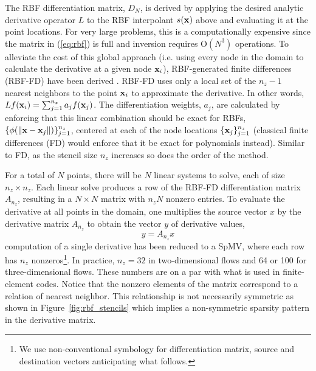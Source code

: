 \documentclass[10pt,conference,compsocconf]{IEEEtran}
\begin{document}
The RBF differentiation matrix, $D_N$, is derived by applying the
desired analytic derivative operator $L$ to the RBF interpolant
$s({\bf x})$ above and evaluating it at the point locations. For very
large problems, this is a computationally expensive since the matrix
in (\ref{eq:rbf}) is full and inversion requires O$(N^3)$
operations. To alleviate the cost of this global approach (i.e. using
every node in the domain to calculate the derivative at a given node
${\bf x}_i$), RBF-generated finite differences (RBF-FD) have been
derived \cite{TAI1,TAI2,SDY02,WrFo06,FoL11,FLBWSC12}. RBF-FD uses only
a local set of the $n_z-1$ nearest neighbors to the point ${\bf x}_i$ to
approximate the derivative. In other words,
$Lf({\bf x}_i)=\sum_{j=1}^{n_z}a_jf({\bf x}_j)$. The differentiation
weights, $a_j$, are calculated by enforcing that this linear
combination should be exact for RBFs,
$\{\phi(\|{\bf x}-{\bf x}_{j}\|)\}_{j=1}^{n_z}$, centered at each of the
node locations $\{{\bf x}_j\}_{j=1}^{n_z}$ (classical finite differences
(FD) would enforce that it be exact for polynomials instead). Similar
to FD, as the stencil size $n_z$ increases so does the order of the
method.

For a total of $N$ points, there will be $N$ linear systems to solve,
each of size $n_z \times n_z$. Each linear solve produces a row of the
RBF-FD differentiation matrix $A_{n_z}$, resulting in a $N \times N$
matrix with $n_zN$ nonzero entries. To evaluate the derivative at all
points in the domain, one multiplies the source vector $x$ by the 
derivative matrix $A_{n_z}$ to obtain the vector $y$ of derivative values, 
$$
  y = A_{n_z} x
$$
computation of a single derivative has been reduced to a SpMV, 
where each row has $n_z$ nonzeros\footnote{We use non-conventional 
symbology for differentiation matrix, source and destination vectors
anticipating what follows.}. 
In practice, $n_z=32$ in two-dimensional flows and 64 or 100 for
three-dimensional flows. These numbers are on a par with what is used in
finite-element codes. Notice that the nonzero elements of the matrix
correspond to a relation of nearest neighbor. This relationship is not
necessarily symmetric as shown in Figure~\ref{fig:rbf_stencils} which
implies a non-symmetric sparsity pattern in the derivative matrix. 
\end{document}
